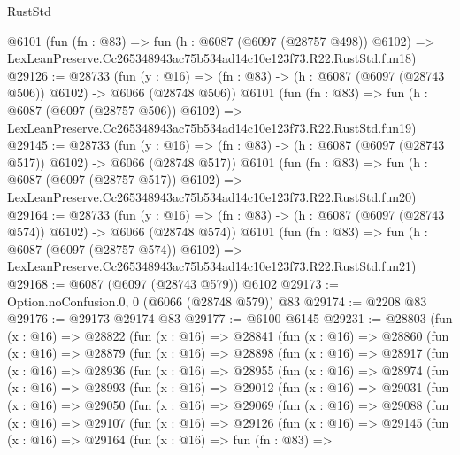 \begin{lexlean}{RustStd}
\begin{coremodule}
    @6101
    (fun (fn : @83) =>
    fun (h : @6087 (@6097 (@28757 @498)) @6102) =>
    LexLeanPreserve.Cc265348943ac75b534ad14c10e123f73.R22.RustStd.fun18)
@29126 := @28733
    (fun (y : @16) => (fn : @83) -> (h : @6087 (@6097 (@28743 @506)) @6102) -> @6066 (@28748 @506))
    @6101
    (fun (fn : @83) =>
    fun (h : @6087 (@6097 (@28757 @506)) @6102) =>
    LexLeanPreserve.Cc265348943ac75b534ad14c10e123f73.R22.RustStd.fun19)
@29145 := @28733
    (fun (y : @16) => (fn : @83) -> (h : @6087 (@6097 (@28743 @517)) @6102) -> @6066 (@28748 @517))
    @6101
    (fun (fn : @83) =>
    fun (h : @6087 (@6097 (@28757 @517)) @6102) =>
    LexLeanPreserve.Cc265348943ac75b534ad14c10e123f73.R22.RustStd.fun20)
@29164 := @28733
    (fun (y : @16) => (fn : @83) -> (h : @6087 (@6097 (@28743 @574)) @6102) -> @6066 (@28748 @574))
    @6101
    (fun (fn : @83) =>
    fun (h : @6087 (@6097 (@28757 @574)) @6102) =>
    LexLeanPreserve.Cc265348943ac75b534ad14c10e123f73.R22.RustStd.fun21)
@29168 := @6087 (@6097 (@28743 @579)) @6102
@29173 := Option.noConfusion.{0, 0} (@6066 (@28748 @579)) @83
@29174 := @2208 @83
@29176 := @29173 @29174 @83
@29177 := @6100 @6145
@29231 := @28803
    (fun (x : @16) =>
    @28822
      (fun (x : @16) =>
      @28841
        (fun (x : @16) =>
        @28860
          (fun (x : @16) =>
          @28879
            (fun (x : @16) =>
            @28898
              (fun (x : @16) =>
              @28917
                (fun (x : @16) =>
                @28936
                  (fun (x : @16) =>
                  @28955
                    (fun (x : @16) =>
                    @28974
                      (fun (x : @16) =>
                      @28993
                        (fun (x : @16) =>
                        @29012
                          (fun (x : @16) =>
                          @29031
                            (fun (x : @16) =>
                            @29050
                              (fun (x : @16) =>
                              @29069
                                (fun (x : @16) =>
                                @29088
                                  (fun (x : @16) =>
                                  @29107
                                    (fun (x : @16) =>
                                    @29126
                                      (fun (x : @16) =>
                                      @29145
                                        (fun (x : @16) =>
                                        @29164
                                          (fun (x : @16) =>
                                          fun (fn : @83) =>

\end{coremodule}
\end{lexlean}
